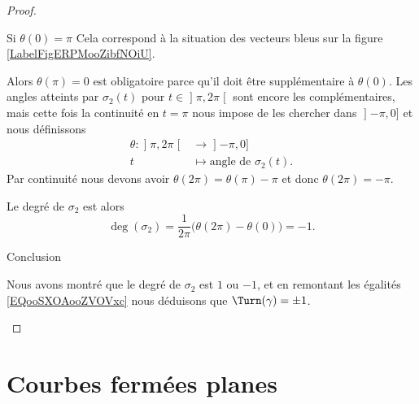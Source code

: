 \begin{proof}
\begin{subproof}
\begin{subproof}
                \item[Si \( \theta(0)=\pi\)]
                    Cela correspond à la situation des vecteurs bleus sur la figure \ref{LabelFigERPMooZibfNOiU}.

                Alors \( \theta(\pi)=0\) est obligatoire parce qu'il doit être supplémentaire à \( \theta(0)\). Les angles atteints par \( \sigma_2(t)\) pour \( t\in\mathopen] \pi , 2\pi \mathclose[ \) sont encore les complémentaires, mais cette fois la continuité en \( t=\pi\) nous impose de les chercher dans \( \mathopen] -\pi , 0 \mathclose]\) et nous définissons
                \begin{equation}
                    \begin{aligned}
                    \theta\colon \mathopen] \pi , 2\pi \mathclose[&\to \mathopen] -\pi , 0 \mathclose] \\
                    t&\mapsto \text{angle de } \sigma_2(t). 
                    \end{aligned}
                \end{equation}
                Par continuité nous devons avoir \( \theta(2\pi)=\theta(\pi)-\pi\) et donc \( \theta(2\pi)=-\pi\).

                Le degré de \( \sigma_2\) est alors
                \begin{equation}
                    \deg(\sigma_2)=\frac{1}{ 2\pi }\big( \theta(2\pi)-\theta(0) \big)=-1.
                \end{equation}
                
            \end{subproof}

        \item[Conclusion]

            Nous avons montré que le degré de \( \sigma_2\) est \( 1\) ou \( -1\), et en remontant les égalités \eqref{EQooSXOAooZVOVxc} nous déduisons que \( \Turn(\gamma)=\pm 1\).

    \end{subproof}
\end{proof}

\section{Courbes fermées planes}

